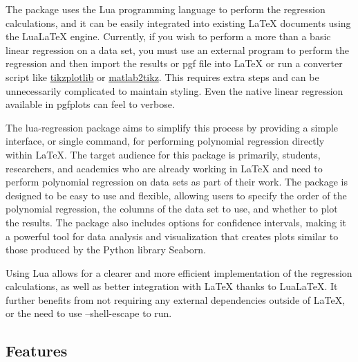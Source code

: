 \documentclass[11pt]{article}
\begin{document}
    The package uses the Lua programming language to perform the regression calculations, and it can be easily integrated into existing \LaTeX{} documents using the Lua\LaTeX{} engine.
    Currently, if you wish to perform a more than a basic linear regression on a data set, you must use an external program to perform the regression and then import the results or pgf file into \LaTeX{} or run a converter script like \href{https://github.com/JasonGross/tikzplotlib}{\ttfamily tikzplotlib} or \href{https://github.com/matlab2tikz/matlab2tikz}{\ttfamily matlab2tikz}.
    This requires extra steps and can be unnecessarily complicated to maintain styling.
    Even the native linear regression available in pgfplots can feel to verbose.

    The {\ttfamily lua-regression} package aims to simplify this process by providing a simple interface, or single command, for performing polynomial regression directly within \LaTeX{}.
    The target audience for this package is primarily, students, researchers, and academics who are already working in \LaTeX{} and need to perform polynomial regression on data sets as part of their work.
    The package is designed to be easy to use and flexible, allowing users to specify the order of the polynomial regression, the columns of the data set to use, and whether to plot the results.
    The package also includes options for confidence intervals, making it a powerful tool for data analysis and visualization that creates plots similar to those produced by the Python library {\ttfamily Seaborn}.

    Using Lua allows for a clearer and more efficient implementation of the regression calculations, as well as better integration with \LaTeX{} thanks to Lua\LaTeX{}.
    It further benefits from not requiring any external dependencies outside of \LaTeX{}, or the need to use {\ttfamily --shell-escape} to run.

    \subsection{Features}
\end{document}
